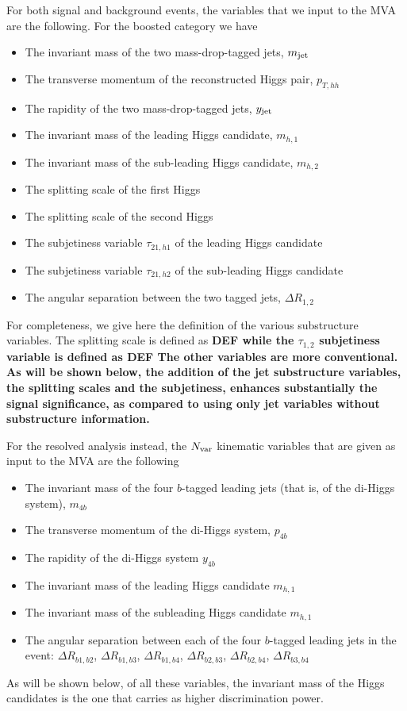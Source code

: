 For both signal and background events, the variables that we input
to the MVA are the following.
%
For the boosted category we have
\begin{itemize}
\item The invariant mass of the two mass-drop-tagged jets, $m_{\rm jet}$
\item The transverse momentum of the reconstructed Higgs pair, $p_{T,hh}$
\item The rapidity of the two mass-drop-tagged jets, $y_{\rm jet}$
\item The invariant mass of the leading Higgs candidate, $m_{h,1}$
\item The invariant mass of the sub-leading Higgs candidate, $m_{h,2}$
\item The splitting scale of the first Higgs
\item The splitting scale of the second Higgs
\item The subjetiness variable $\tau_{21,h1}$ of the leading Higgs candidate
\item The subjetiness variable $\tau_{21,h2}$
  of the sub-leading Higgs candidate
 \item The angular separation between the two tagged jets, $\Delta R_{1,2}$ 
\end{itemize}
For completeness, we give here the definition of the various substructure variables.
%
The splitting scale is defined as
\be
\bf DEF
\ee
while the $\tau_{1,2}$ subjetiness variable is defined as
\be
\bf DEF
\ee
The other variables are more conventional.
%
As will be shown below, the addition of the jet substructure variables,
the splitting scales and the subjetiness,
enhances substantially the signal significance, as compared
to using only jet variables without substructure information.

For the resolved analysis instead, the $N_{\rm var}$ kinematic variables
that are given as input to the MVA are the following
\begin{itemize}
\item The invariant mass of the four $b$-tagged leading jets (that
  is, of the di-Higgs system), $m_{4b}$
\item The transverse momentum of the di-Higgs system, $p_{4b}$
\item The rapidity of the di-Higgs system $y_{4b}$
\item The invariant mass of the leading Higgs candidate $m_{h,1}$
\item The invariant mass of the subleading Higgs candidate $m_{h,1}$
\item The angular separation between each of the four
  $b$-tagged leading jets in the event: $\Delta R_{b1,b2}$,
  $\Delta R_{b1,b3}$, $\Delta R_{b1,b4}$, $\Delta R_{b2,b3}$,
  $\Delta R_{b2,b4}$, $\Delta R_{b3,b4}$
\end{itemize}
As will be shown below, of all these variables, the invariant mass of the
Higgs candidates is the one that carries as higher discrimination
power.

